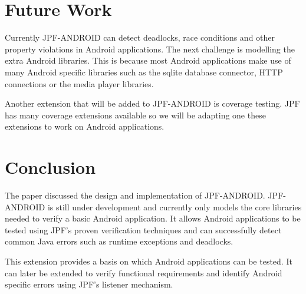 \documentclass{acm_proc_article-sp}
\begin{document}
\section{Future Work}
Currently JPF-ANDROID can detect deadlocks, race conditions and other property violations in Android applications. The next challenge is
modelling the extra Android libraries. This is because most Android applications make use of many Android specific
libraries such as the sqlite database connector, HTTP connections or the media player libraries.

Another extension that will be added to JPF-ANDROID is coverage testing. JPF has many coverage extensions available so we will be adapting
one these extensions to work on Android applications.

\section{Conclusion}
The paper discussed the design and implementation of JPF-ANDROID. JPF-ANDROID is still under development and currently only models
the core libraries needed to verify a basic Android application. It allows Android applications to be tested using JPF's proven verification
techniques and can successfully detect common Java errors such as runtime exceptions and deadlocks. 

This extension provides a basis on which Android applications can be tested. It can later be extended to verify functional requirements
and identify Android specific errors using JPF's listener mechanism.
\vspace*{5pt}

\scriptsize
\end{document}
